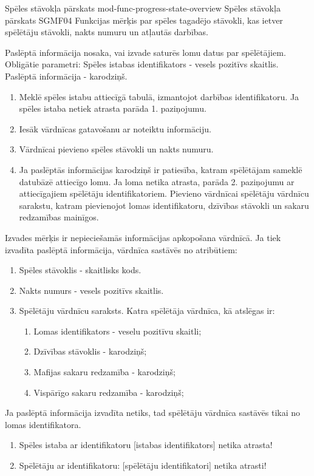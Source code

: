 \moduleFunctionTable
{Spēles stāvokļa pārskats}
{mod-func-progress-state-overview}
{Spēles stāvokļa pārskats}
{SGMF04}
{
	Funkcijas mērķis par spēles tagadējo stāvokli, kas ietver spēlētāju stāvokli, nakts numuru un atļautās darbības.
}
{
	Paslēptā informācija nosaka, vai izvade saturēs lomu datus par spēlētājiem.
	Obligātie parametri:
	Spēles istabas identifikators - vesels pozitīvs skaitlis.
	Paslēptā informācija - karodziņš.

}
{
	\begin{enumerate}
		\item Meklē spēles istabu attiecīgā tabulā, izmantojot darbības identifikatoru.
		      Ja spēles istaba netiek atrasta parāda 1. paziņojumu.
		\item Iesāk vārdnīcas gatavošanu ar noteiktu informāciju.
		\item Vārdnīcai pievieno spēles stāvokli un nakts numuru.
		\item Ja paslēptās informācijas karodziņš ir patiesība, katram spēlētājam sameklē datubāzē attiecīgo lomu.
		      Ja loma netika atrasta, parāda 2. paziņojumu ar attiecīgajiem spēlētāju identifikatoriem.
		      Pievieno vārdnīcai spēlētāju vārdnīcu sarakstu, katram pievienojot lomas identifikatoru, dzīvības stāvokli un sakaru redzamības mainīgos.
	\end{enumerate}
}
{
	Izvades mērķis ir nepieciešamās informācijas apkopošana vārdnīcā.
	Ja tiek izvadīta paslēptā informācija, vārdnīca sastāvēs no atribūtiem:
	\begin{enumerate}
		\item Spēles stāvoklis - skaitlisks kods.
		\item Nakts numurs - vesels pozitīvs skaitlis.
		\item Spēlētāju vārdnīcu saraksts. Katra spēlētāja vārdnīca, kā atslēgas ir:
		      \begin{enumerate}
			      \item Lomas identifikators - veselu pozitīvu skaitli;
			      \item Dzīvības stāvoklis - karodziņš;
			      \item Mafijas sakaru redzamība - karodziņš;
			      \item Vispārīgo sakaru redzamība - karodziņš;
		      \end{enumerate}

	\end{enumerate}
	Ja paslēptā informācija izvadīta netiks, tad spēlētāju vārdnīca sastāvēs tikai no lomas identifikatora.
}
{
	\begin{enumerate}
		\item Spēles istaba ar identifikatoru [istabas identifikators] netika atrasta!
		\item Spēlētāju ar identifikatoru: [spēlētāju identifikatori] netika atrasti!
	\end{enumerate}
}

